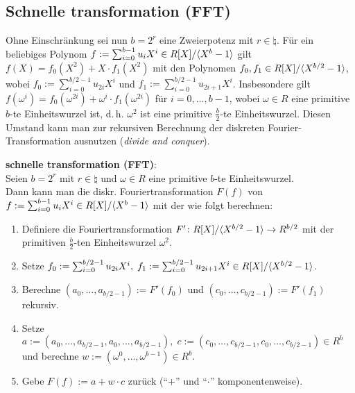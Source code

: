 \pagebreak

\subsection{%
    Schnelle transformation (FFT)%
}

Ohne Einschränkung sei nun $b = 2^r$ eine Zweierpotenz mit $r \in \natural$.
Für ein beliebiges Polynom $f := \sum_{i=0}^{b-1} u_i X^i \in R[X]/\langle X^b - 1\rangle$ gilt
$f(X) = f_0(X^2) + X \cdot f_1(X^2)$ mit den Polynomen
$f_0, f_1 \in R[X]/\langle X^{b/2} - 1\rangle$,
wobei $f_0 := \sum_{i=0}^{b/2-1} u_{2i} X^i$ und
$f_1 := \sum_{i=0}^{b/2-1} u_{2i+1} X^i$.
Insbesondere gilt $f(\omega^i) = f_0(\omega^{2i}) + \omega^i \cdot f_1(\omega^{2i})$
für $i = 0, \dotsc, b - 1$,
wobei $\omega \in R$ eine primitive $b$-te Einheitswurzel ist,
d.\,h. $\omega^2$ ist eine primitive $\frac{b}{2}$-te Einheitswurzel.
Diesen Umstand kann man zur rekursiven Berechnung der diskreten Fourier-Transformation ausnutzen
(\emph{divide and conquer}).

\textbf{schnelle transformation (FFT)}:\\
Seien $b = 2^r$ mit $r \in \natural$ und $\omega \in R$ eine primitive $b$-te Einheitswurzel.\\
Dann kann man die diskr. Fouriertransformation $F(f)$ von
$f := \sum_{i=0}^{b-1} u_i X^i \in R[X]/\langle X^b - 1\rangle$
mit der  wie folgt berechnen:
\begin{enumerate}
    \item
    Definiere die Fouriertransformation $F'\colon R[X]/\langle X^{b/2} - 1\rangle \to R^{b/2}$
    mit der primitiven $\frac{b}{2}$-ten Einheitswurzel $\omega^2$.

    \item
    Setze
    $f_0 := \sum_{i=0}^{b/2-1} u_{2i} X^i,\;
    f_1 := \sum_{i=0}^{b/2-1} u_{2i+1} X^i \in R[X]/\langle X^{b/2} - 1\rangle$.

    \item
    Berechne $(a_0, \dotsc, a_{b/2-1}) := F'(f_0)$ und
    $(c_0, \dotsc, c_{b/2-1}) := F'(f_1)$ rekursiv.

    \item
    Setze $a := (a_0, \dotsc, a_{b/2-1}, a_0, \dotsc, a_{b/2-1}),\;
    c := (c_0, \dotsc, c_{b/2-1}, c_0, \dotsc, c_{b/2-1}) \in R^b$ und berechne
    $w := (\omega^0, \dotsc, \omega^{b-1}) \in R^b$.

    \item
    Gebe $F(f) := a + w \cdot c$ zurück ("`$+$"' und "`$\cdot$"' komponentenweise).
\end{enumerate}


